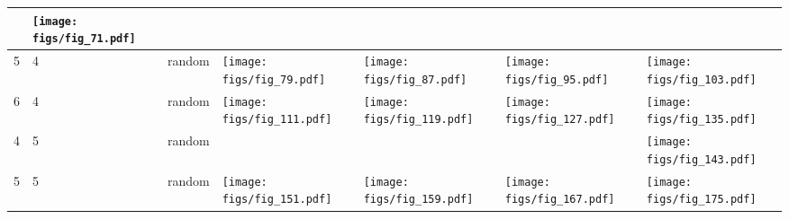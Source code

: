 \documentclass[oneside,canadian,landscape]{article}
\begin{document}
\begin{center}
\begin{longtable}{|l|l|l||l|l|l|l|}
&\begin{minipage}{3.5cm}
\texttt{[image: figs/fig\_71.pdf]}
\end{minipage}
&\\ \hline
5&4&random&\begin{minipage}{3.5cm}
\texttt{[image: figs/fig\_79.pdf]}
\end{minipage}
&\begin{minipage}{3.5cm}
\texttt{[image: figs/fig\_87.pdf]}
\end{minipage}
&\begin{minipage}{3.5cm}
\texttt{[image: figs/fig\_95.pdf]}
\end{minipage}
&\begin{minipage}{3.5cm}
\texttt{[image: figs/fig\_103.pdf]}
\end{minipage}
\\ \hline
6&4&random&\begin{minipage}{3.5cm}
\texttt{[image: figs/fig\_111.pdf]}
\end{minipage}
&\begin{minipage}{3.5cm}
\texttt{[image: figs/fig\_119.pdf]}
\end{minipage}
&\begin{minipage}{3.5cm}
\texttt{[image: figs/fig\_127.pdf]}
\end{minipage}
&\begin{minipage}{3.5cm}
\texttt{[image: figs/fig\_135.pdf]}
\end{minipage}
\\ \hline
4&5&random&&&&\begin{minipage}{3.5cm}
\texttt{[image: figs/fig\_143.pdf]}
\end{minipage}
\\ \hline
5&5&random&\begin{minipage}{3.5cm}
\texttt{[image: figs/fig\_151.pdf]}
\end{minipage}
&\begin{minipage}{3.5cm}
\texttt{[image: figs/fig\_159.pdf]}
\end{minipage}
&\begin{minipage}{3.5cm}
\texttt{[image: figs/fig\_167.pdf]}
\end{minipage}
&\begin{minipage}{3.5cm}
\texttt{[image: figs/fig\_175.pdf]}
\end{minipage}
\\ \hline

\end{longtable}
\end{center}
\end{document}
